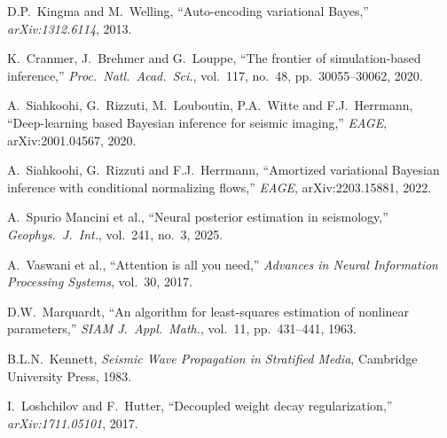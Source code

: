 \documentclass[11pt,a4paper]{article}
\theoremstyle{plain}
\theoremstyle{remark}
\begin{document}
\begin{enumerate}[label={[\arabic*]},nosep]
  \item D.P.\ Kingma and M.\ Welling, ``Auto-encoding variational Bayes,''
    \emph{arXiv:1312.6114}, 2013.
  \item K.\ Cranmer, J.\ Brehmer and G.\ Louppe, ``The frontier of
    simulation-based inference,'' \emph{Proc.\ Natl.\ Acad.\ Sci.},
    vol.~117, no.~48, pp.~30055--30062, 2020.
  \item A.\ Siahkoohi, G.\ Rizzuti, M.\ Louboutin, P.A.\ Witte and
    F.J.\ Herrmann, ``Deep-learning based Bayesian inference for seismic
    imaging,'' \emph{EAGE}, arXiv:2001.04567, 2020.
  \item A.\ Siahkoohi, G.\ Rizzuti and F.J.\ Herrmann, ``Amortized
    variational Bayesian inference with conditional normalizing flows,''
    \emph{EAGE}, arXiv:2203.15881, 2022.
  \item A.\ Spurio Mancini et al., ``Neural posterior estimation in
    seismology,'' \emph{Geophys.\ J.\ Int.}, vol.~241, no.~3, 2025.
  \item A.\ Vaswani et al., ``Attention is all you need,''
    \emph{Advances in Neural Information Processing Systems}, vol.~30,
    2017.
  \item D.W.\ Marquardt, ``An algorithm for least-squares estimation of
    nonlinear parameters,'' \emph{SIAM J.\ Appl.\ Math.}, vol.~11,
    pp.~431--441, 1963.
  \item B.L.N.\ Kennett, \emph{Seismic Wave Propagation in Stratified
    Media}, Cambridge University Press, 1983.
  \item I.\ Loshchilov and F.\ Hutter, ``Decoupled weight decay
    regularization,'' \emph{arXiv:1711.05101}, 2017.
\end{enumerate}
\end{document}
